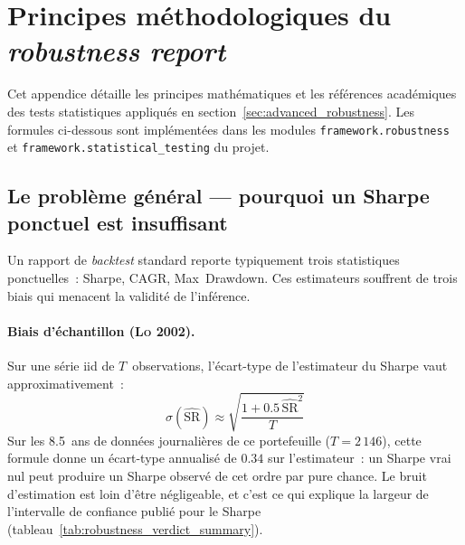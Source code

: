 \section{Principes méthodologiques du \textit{robustness report}}
\label{app:robustness_methodology}

Cet appendice détaille les principes mathématiques et les références académiques des tests statistiques appliqués en section~\ref{sec:advanced_robustness}. Les formules ci-dessous sont implémentées dans les modules \texttt{framework.robustness} et \texttt{framework.statistical\_testing} du projet.

\subsection{Le problème général --- pourquoi un Sharpe ponctuel est insuffisant}
\label{app:robustness_problem}

Un rapport de \emph{backtest} standard reporte typiquement trois statistiques ponctuelles~: Sharpe, CAGR, Max~Drawdown. Ces estimateurs souffrent de trois biais qui menacent la validité de l'inférence.

\paragraph{Biais d'échantillon (\textsc{Lo} 2002).} Sur une série iid de $T$~observations, l'écart-type de l'estimateur du Sharpe vaut approximativement~:
\begin{equation}
\sigma(\widehat{\mathrm{SR}}) \approx \sqrt{\frac{1 + 0.5\,\widehat{\mathrm{SR}}^{2}}{T}}
\label{eq:lo_sharpe_std}
\end{equation}
Sur les 8.5~ans de données journalières de ce portefeuille ($T = 2\,146$), cette formule donne un écart-type annualisé de $0.34$ sur l'estimateur~: un Sharpe vrai nul peut produire un Sharpe observé de cet ordre par pure chance. Le bruit d'estimation est loin d'être négligeable, et c'est ce qui explique la largeur de l'intervalle de confiance publié pour le Sharpe (tableau~\ref{tab:robustness_verdict_summary}).

